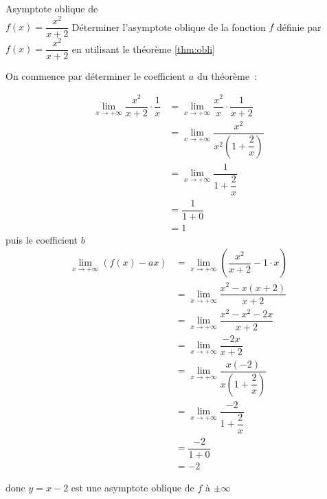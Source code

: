 \documentclass[a4paper,12pt]{article}
\begin{document}
\begin{exemple}
	Asymptote oblique de\\
	\medskip
	$f(x)=\dfrac{x^2}{x+2}$
	\tcblower
Déterminer l'asymptote oblique de la fonction $f$ définie par $f(x) = \dfrac{x^2}{x+2}$ en utilisant le théorème \ref{thm:obli}

On commence par déterminer le coefficient $a$ du théorème~:

\begin{align*}
\displaystyle\lim_{x \to +\infty} \dfrac{x^2}{x+2} \cdot \dfrac{1}{x} &= \displaystyle\lim_{x \to +\infty} \dfrac{x^2}{x} \cdot \dfrac{1}{x+2}\\	
&= \displaystyle\lim_{x \to +\infty} \dfrac{x^2}{x^2(1+\dfrac{2}{x})}\\
&= \displaystyle\lim_{x \to +\infty} \dfrac{1}{1+\dfrac{2}{x}}\\
&= \dfrac{1}{1+0} \\
&= 1
\end{align*}
puis le coefficient $b$
\begin{align*}
\displaystyle\lim_{x \to +\infty} (f(x) - ax) &= \displaystyle\lim_{x \to +\infty} \left(\dfrac{x^2}{x+2} - 1 \cdot x\right)\\
					      &= \displaystyle\lim_{x \to +\infty} \dfrac{x^2 - x(x+2)}{x+2}\\
					      &= \displaystyle\lim_{x \to +\infty} \dfrac{x^2 - x^2 - 2x}{x+2}\\ 
					      &= \displaystyle\lim_{x \to +\infty} \dfrac{-2x}{x+2} \\
&= \displaystyle\lim_{x \to +\infty} \dfrac{x(-2)}{x(1+\dfrac{2}{x})}\\
&= \displaystyle\lim_{x \to +\infty} \dfrac{-2}{1+\dfrac{2}{x}} \\
&= \dfrac{-2}{1+0} \\
&= -2
\end{align*}

donc $y = x - 2$ est une asymptote oblique de $f$ à $\pm\infty$

\end{exemple}



\end{document}
